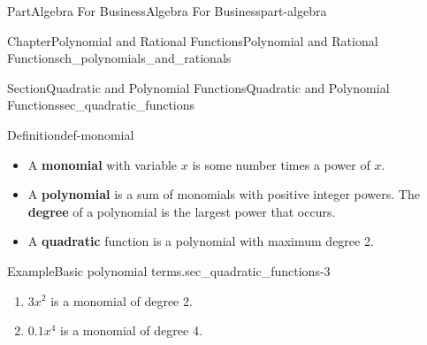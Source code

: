 \documentclass{tufte-book}
\newcommand{\terminology}[1]{\textbf{#1}}
\numberwithin{equation}{chapter}
\begin{document}
\begin{partptx}{Part}{Algebra For Business}{}{Algebra For Business}{}{}{part-algebra}
\begin{chapterptx}{Chapter}{Polynomial and Rational Functions}{}{Polynomial and Rational Functions}{}{}{ch_polynomials_and_rationals}
\begin{introduction}{}
\begin{image}{0}{1}{0}{}
{
}%
\end{image}%
\end{introduction}%
%
%
\typeout{************************************************}
\typeout{************************************************}
%
\begin{sectionptx}{Section}{Quadratic and Polynomial Functions}{}{Quadratic and Polynomial Functions}{}{}{sec_quadratic_functions}
\begin{definition}{Definition}{}{def-monomial}%
%
\begin{itemize}[label=\textbullet]
\item{}A \terminology{monomial} with variable \(x\) is some number times a power of \(x\).%
\item{}A \terminology{polynomial} is a sum of monomials with positive integer powers.  The \terminology{degree} of a polynomial is the largest power that occurs.%
\item{}A \terminology{quadratic} function is a polynomial with maximum degree 2.%
\end{itemize}
%
\end{definition}
\begin{example}{Example}{Basic polynomial terms.}{sec_quadratic_functions-3}%
%
\begin{enumerate}
\item{}\(3x^2\) is a monomial of degree 2.%
\item{}\(0.1 x^4\) is a monomial of degree 4.%

\end{enumerate}
\end{example}
\end{sectionptx}
\end{chapterptx}
\end{partptx}
\end{document}
